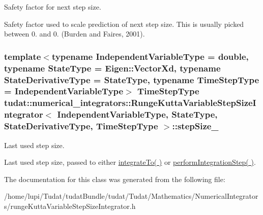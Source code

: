 Safety factor for next step size. 

Safety factor used to scale prediction of next step size. This is usually picked between 0. and 0. (Burden and Faires, 2001). 
\subsubsection[{\texorpdfstring{step\+Size\+\_\+}{stepSize_}}]{\setlength{\rightskip}{0pt plus 5cm}template$<$typename Independent\+Variable\+Type  = double, typename State\+Type  = Eigen\+::\+Vector\+Xd, typename State\+Derivative\+Type  = State\+Type, typename Time\+Step\+Type  = Independent\+Variable\+Type$>$ Time\+Step\+Type {\bf tudat\+::numerical\+\_\+integrators\+::\+Runge\+Kutta\+Variable\+Step\+Size\+Integrator}$<$ Independent\+Variable\+Type, State\+Type, State\+Derivative\+Type, Time\+Step\+Type $>$\+::step\+Size\+\_\+\hspace{0.3cm}{\ttfamily [protected]}}\hypertarget{classtudat_1_1numerical__integrators_1_1RungeKuttaVariableStepSizeIntegrator_a43038f69dbf2e852b547dec2085e5a45}{}\label{classtudat_1_1numerical__integrators_1_1RungeKuttaVariableStepSizeIntegrator_a43038f69dbf2e852b547dec2085e5a45}


Last used step size. 

Last used step size, passed to either \hyperlink{classtudat_1_1numerical__integrators_1_1NumericalIntegrator_aed0dfa86d274bd9e71c2fd6428edfd3e}{integrate\+To( )} or \hyperlink{classtudat_1_1numerical__integrators_1_1RungeKuttaVariableStepSizeIntegrator_a34e884253297c9bfb17d756c36510cc4}{perform\+Integration\+Step( )}. 

The documentation for this class was generated from the following file\+:\begin{DoxyCompactItemize}
\item 
/home/lupi/\+Tudat/tudat\+Bundle/tudat/\+Tudat/\+Mathematics/\+Numerical\+Integrators/runge\+Kutta\+Variable\+Step\+Size\+Integrator.\+h\end{DoxyCompactItemize}
